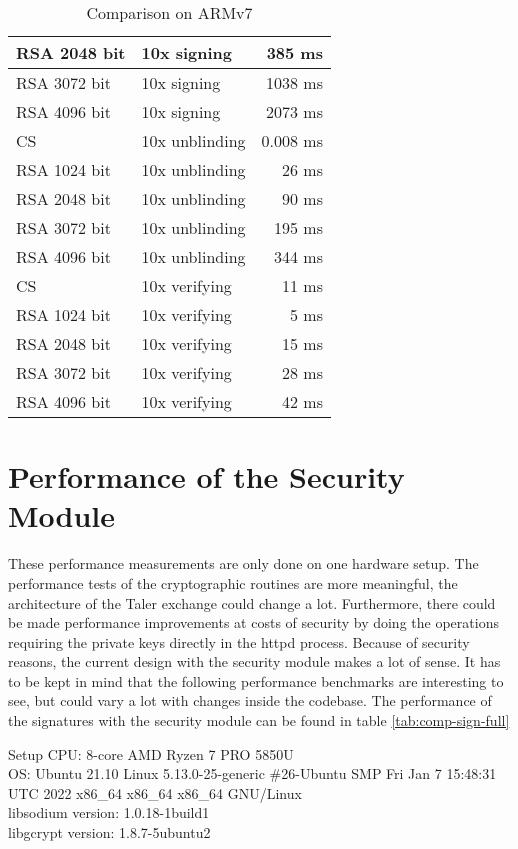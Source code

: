 \begin{table}[ht]
\begin{tabular}{llr}
        RSA 2048 bit & 10x signing & 385 ms \\\hline
        RSA 3072 bit & 10x signing & 1038 ms \\\hline
        RSA 4096 bit & 10x signing & 2073 ms \\\hline
        \hline
        CS & 10x unblinding & 0.008 ms \\\hline
        RSA 1024 bit & 10x unblinding & 26 ms \\\hline
        RSA 2048 bit & 10x unblinding & 90 ms \\\hline
        RSA 3072 bit & 10x unblinding & 195 ms \\\hline
        RSA 4096 bit & 10x unblinding & 344 ms \\\hline
        \hline
        CS & 10x verifying & 11 ms \\\hline
        RSA 1024 bit & 10x verifying & 5 ms \\\hline
        RSA 2048 bit & 10x verifying & 15 ms \\\hline
        RSA 3072 bit & 10x verifying & 28 ms \\\hline
        RSA 4096 bit & 10x verifying & 42 ms \\\hline
    \end{tabular}
    \caption{Comparison on ARMv7}
    \label{tab:comp-sign-armv7}
\end{table}


\section{Performance of the Security Module}
These performance measurements are only done on one hardware setup.
The performance tests of the cryptographic routines are more meaningful, the architecture of the Taler exchange could change a lot.
Furthermore, there could be made performance improvements at costs of security by doing the operations requiring the private keys directly in the httpd process.
Because of security reasons, the current design with the security module makes a lot of sense. 
It has to be kept in mind that the following performance benchmarks are interesting to see, but could vary a lot with changes inside the codebase.
The performance of the signatures with the security module can be found in table \ref{tab:comp-sign-full}
\begin{bfhBox}{Setup}
	CPU: 8-core AMD Ryzen 7 PRO 5850U \\
    OS: Ubuntu 21.10 Linux 5.13.0-25-generic \#26-Ubuntu SMP Fri Jan 7 15:48:31 UTC 2022 x86\_64 x86\_64 x86\_64 GNU/Linux \\
    libsodium version: 1.0.18-1build1 \\ 
    libgcrypt version: 1.8.7-5ubuntu2 
\end{bfhBox}

